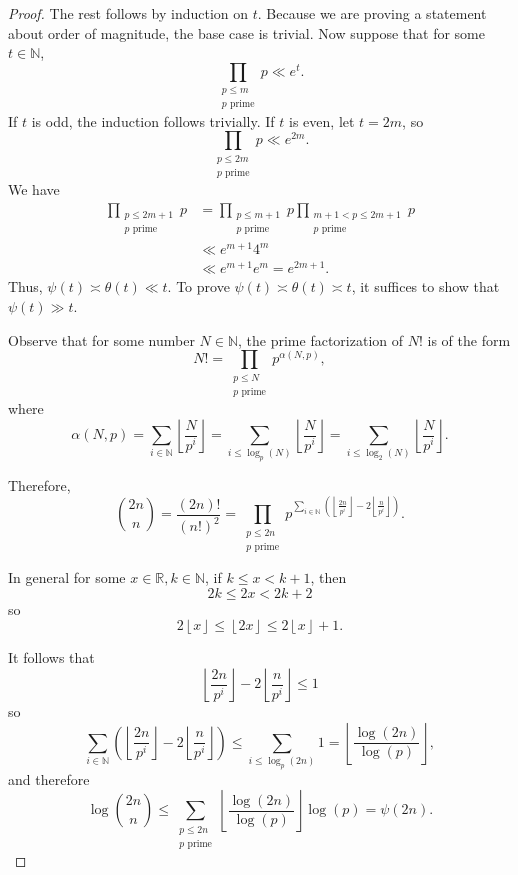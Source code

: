 \documentclass[12pt,reqno]{amsart}
\begin{document}
\begin{proof}
The rest follows by induction on \(t\). Because we are proving
a statement about order of magnitude, the base case is trivial. Now suppose that
for some \(t \in \mathbb{N} \),
\[
    \prod _{\substack{ p \leq m \\p \text{ prime}  }} p \ll e^{t}
.\]
If \(t\) is odd, the induction follows trivially. If \(t\) is even, let \(t = 2m\),
so
\[
    \prod  _{\substack{ p \leq 2m \\ p \text{ prime}  }} p\ll e^{2m}
.\]
We have
\begin{align*}
\prod _{\substack{ p \leq 2m + 1 \\ p \text{ prime}  }} p & = \prod _{\substack{ p \leq m + 1 \\ p \text{ prime}  }} p \prod _{\substack{ m + 1 < p \leq 2m + 1 \\ p \text{ prime}  }} p \\
& \ll e^{m + 1} 4^{m} \\
& \ll e^{m+1} e^{m} = e^{2m+1}. 
\end{align*}
Thus, \(\psi(t) \asymp \theta(t) \ll t\). To prove \(\psi(t) \asymp \theta(t) \asymp t\),
it suffices to show that \(\psi(t) \gg t\).

Observe that for some number \(N \in \mathbb{N} \), the prime factorization of \(N!\) is of the form
\[
    N! = \prod _{\substack{ p \leq N \\ p \text{ prime}  }} p ^{\alpha(N,p)}
,\]
where
\[
    \alpha(N,p) = \sum _{i \in \mathbb{N} } \left\lfloor \frac{N}{p ^{i}}  \right\rfloor = \sum _{i \leq \log _{p} \left( N \right) } \left\lfloor \frac{N}{p ^{i}}  \right\rfloor  =\sum _{i \leq \log _{2} \left( N \right) } \left\lfloor \frac{N}{p ^{i}}  \right\rfloor 
.\]

Therefore,
\[
    \binom{2n}{n} = \frac{\left( 2n \right) !}{\left( n!  \right) ^{2}} = \prod _{\substack{ p \leq 2n \\ p \text{ prime}  }} p ^{ \sum _{i \in \mathbb{N} } \left( \left\lfloor \frac{2n}{p^{i}}  \right\rfloor - 2 \left\lfloor \frac{n}{p ^{i}}  \right\rfloor \right)  }
.\]

In general for some \(x \in \mathbb{R}, k \in \mathbb{N} \), if \(k \leq x < k +1\), then
\[
    2k \leq 2x < 2k + 2
\]
so
\[
    2\left\lfloor x \right\rfloor \leq \left\lfloor 2x \right\rfloor \leq 2\left\lfloor x \right\rfloor +1
.\]

It follows that
\[
    \left\lfloor \frac{2n}{p^{i}}  \right\rfloor - 2 \left\lfloor \frac{n}{p ^{i}}  \right\rfloor \leq  1
\]
so
\[
    \sum _{i \in \mathbb{N} } \left( \left\lfloor \frac{2n}{p^{i}}  \right\rfloor - 2 \left\lfloor \frac{n}{p ^{i}}  \right\rfloor  \right) \leq \sum_{i \leq \log _{p} \left( 2n \right) } 1 = \left\lfloor \frac{\log \left( 2n \right) }{\log \left( p \right) }  \right\rfloor 
,\]
and therefore
\[
    \log \binom{2n}{n} \leq \sum _{\substack{ p \leq 2n \\ p \text{ prime}  }} \left\lfloor \frac{\log \left( 2n \right) }{\log \left( p \right) }  \right\rfloor \log \left( p \right) = \psi(2n)
.\]


\end{proof}
\end{document}
